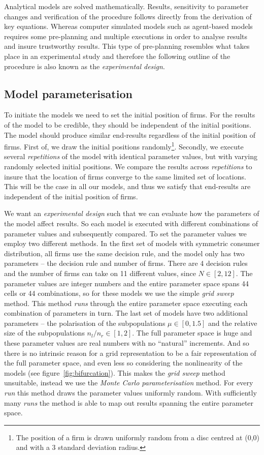 \documentclass[preprint, 12pt]{elsarticle}
\begin{document}
Analytical models are solved mathematically. Results, sensitivity to parameter changes and verification of the procedure follows directly from the derivation of key equations. Whereas computer simulated models such as agent-based models requires some pre-planning and multiple executions in order to analyse results and insure trustworthy results. This type of pre-planning resembles what takes place in an experimental study and therefore the following outline of the procedure is also known as the \emph{experimental design}.

\subsection{Model parameterisation}

To initiate the models we need to set the initial position of firms. For the results of the model to be credible, they should be independent of the initial positions. The model should produce similar end-results regardless of the initial position of firms. First of, we draw the initial positions randomly\footnote{The position of a firm is drawn uniformly random from a disc centred at (0,0) and with a 3 standard deviation radius.}. Secondly, we execute several \emph{repetitions} of the model with identical parameter values, but with varying randomly selected initial positions. We compare the results across \emph{repetitions} to insure that the location of firms converge to the same limited set of locations. This will be the case in all our models, and thus we satisfy that end-results are independent of the initial position of firms.

We want an \emph{experimental design} such that we can evaluate how the parameters of the model affect results. So each model is executed with different combinations of parameter values and subsequently compared. To set the parameter values we employ two different methods. In the first set of models with symmetric consumer distribution, all firms use the same decision rule, and the model only has two parameters -- the decision rule and number of firms. There are 4 decision rules and the number of firms can take on 11 different values, since $N \in [2, 12]$. The parameter values are integer numbers and the entire parameter space spans 44 cells or 44 combinations, so for these models we use the simple \emph{grid sweep} method. This method \emph{runs} through the entire parameter space executing each combination of parameters in turn. The last set of models have two additional parameters -- the polarisation of the subpopulations $\mu \in [0, 1.5]$ and the relative size of the subpopulations $n_l/n_r \in [1, 2]$. The full parameter space is huge and these parameter values are real numbers with no ``natural'' increments. And so there is no intrinsic reason for a grid representation to be a fair representation of the full parameter space, and even less so considering the nonlinearity of the models (see figure~\ref{fig:bifurcation}). This makes the \emph{grid sweep} method unsuitable, instead we use the \emph{Monte Carlo parameterisation} method. For every \emph{run} this method draws the parameter values uniformly random. With sufficiently many \emph{runs} the method is able to map out results spanning the entire parameter space.
\end{document}
